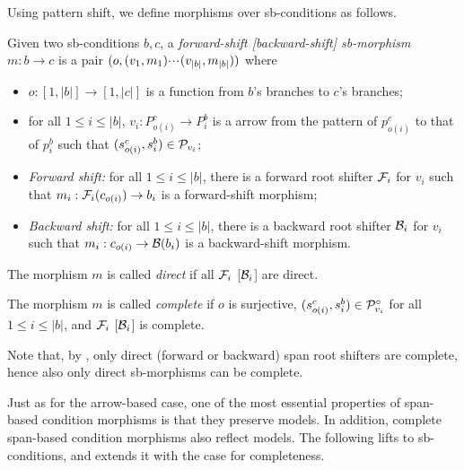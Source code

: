 Using pattern shift, we define morphisms over sb-conditions as follows.
%
\begin{definition}
  Given two sb-conditions $b,c$, a \emph{forward-shift [backward-shift] sb-morphism} $m:b\to c$ is a pair $(o,(v_1,m_1){\cdotp\mkern-2mu\cdotp\mkern-2mu\cdotp\mkern1mu} (v_{|b|},m_{|b|}))$ where
  \begin{itemize}[topsep=\smallskipamount]
  \item $o:[1,|b|]\to [1,|c|]$ is a function from $b$'s branches to $c$'s branches;
  \item for all $1\leq i\leq |b|$, $v_i:P^c_{o(i)}\to P^b_i$ is a arrow from the pattern of $p^c_{o(i)}$ to that of $p^b_i$ such that $(s^c_{o(i)},s^b_i)\in \mathcal{P}_{v_i}$;
  \item \emph{Forward shift:} for all $1\leq i\leq |b|$, there is a forward root shifter $\mathcal{F}_i$ for $v_i$ such that $m_i:\mathcal{F}_i(c_{o(i)})\to b_i$ is a forward-shift morphism;
  \item \emph{Backward shift:} for all $1\leq i\leq |b|$, there is a backward root shifter $\mathcal{B}_i$ for $v_i$ such that $m_i:c_{o(i)}\to \mathcal{B}(b_i)$ is a backward-shift morphism.
  \end{itemize}
  The morphism $m$ is called \emph{direct} if all $\mathcal{F}_i$ [$\mathcal{B}_i$] are direct.
  
  The morphism $m$ is called \emph{complete} if $o$ is surjective, $(s^c_{o(i)},s^b_i)\in \mathcal{P}^\circ_{v_i}$ for all $1\leq i\leq |b|$, and $\mathcal{F}_i$ [$\mathcal{B}_i$] is complete.
\end{definition}
%
Note that, by , only direct (forward or backward) span root shifters are complete, hence also only direct sb-morphisms can be complete.

Just as for the arrow-based case, one of the most essential properties of span-based condition morphisms is that they preserve models. In addition, complete span-based condition morphisms also reflect models. The following lifts  to sb-conditions, and extends it with the case for completeness.

